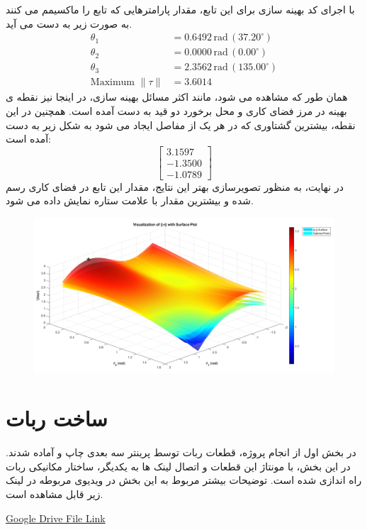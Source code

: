 \FloatBarrier
با اجرای کد بهینه سازی برای این تابع، مقدار پارامترهایی که تابع را ماکسیمم می کنند به صورت زیر به دست می آید.
\[
\begin{aligned}
	\theta_1 &= 0.6492 \, \text{rad} \, (37.20^\circ) \\
	\theta_2 &= 0.0000 \, \text{rad} \, (0.00^\circ) \\
	\theta_3 &= 2.3562 \, \text{rad} \, (135.00^\circ) \\
	\text{Maximum } \| \tau \| &= 3.6014
\end{aligned}
\]
همان طور که مشاهده می شود، مانند اکثر مسائل بهینه سازی، در اینجا نیز نقطه ی بهینه در مرز فضای کاری و محل برخورد دو قید به دست آمده است.
همچنین در این نقطه، بیشترین گشتاوری که در هر یک از مفاصل ایجاد می شود به شکل زیر به دست آمده است:
\[
\begin{bmatrix}
	3.1597 \\
	-1.3500 \\
	-1.0789
\end{bmatrix}
\]
در نهایت، به منظور تصویرسازی بهتر این نتایج، مقدار این تابع در فضای کاری رسم شده و بیشترین مقدار با علامت ستاره نمایش داده می شود.
\begin{figure}[htbp]
	\centering
	\includegraphics[width=1\linewidth]{../img/optimization}
	\caption{}
	\label{fig:optimization}
\end{figure}
\FloatBarrier

\section*{ساخت ربات}
در بخش اول از انجام پروژه، قطعات ربات توسط پرینتر سه بعدی چاپ و آماده شدند.
در این بخش، با مونتاژ این قطعات و اتصال لینک ها به یکدیگر، ساختار مکانیکی ربات راه اندازی شده است. توضیحات بیشتر مربوط به این بخش در ویدیوی مربوطه در لینک زیر قابل مشاهده است.

\href{https://drive.google.com/file/d/17V7TAT9te26FD_Y5RqOXTyA95ST1Dq6s/view?usp=sharing}{Google Drive File Link}







